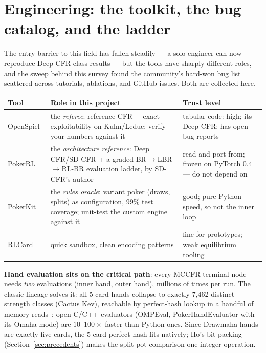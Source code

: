 \section{Engineering: the toolkit, the bug catalog, and the ladder}\label{sec:engineering}

The entry barrier to this field has fallen steadily --- a solo engineer can now reproduce Deep-CFR-class results --- but the tools have sharply different roles, and the sweep behind this survey found the community's hard-won bug list scattered across tutorials, ablations, and GitHub issues. Both are collected here.

\begin{center}
\footnotesize
\begin{tabular}{@{}lp{2.45in}p{1.5in}@{}}
\toprule
Tool & Role in this project & Trust level \\
\midrule
OpenSpiel~\cite{openspiel} & the \emph{referee}: reference CFR + exact exploitability on Kuhn/Leduc; verify your numbers against it & tabular code: high; its Deep CFR: has open bug reports \\
PokerRL~\cite{pokerrl} & the \emph{architecture reference}: Deep CFR/SD-CFR + a graded BR$\to$LBR$\to$RL-BR evaluation ladder, by SD-CFR's author & read and port from; frozen on PyTorch 0.4 --- do not depend on \\
PokerKit~\cite{pokerkit} & the \emph{rules oracle}: variant poker (draws, splits) as configuration, 99\% test coverage; unit-test the custom engine against it & good; pure-Python speed, so not the inner loop \\
RLCard~\cite{rlcard} & quick sandbox, clean encoding patterns & fine for prototypes; weak equilibrium tooling \\
\bottomrule
\end{tabular}
\end{center}

\textbf{Hand evaluation sits on the critical path}: every MCCFR terminal node needs \emph{two} evaluations (inner hand, outer hand), millions of times per run. The classic lineage solves it: all 5-card hands collapse to exactly 7{,}462 distinct strength classes (Cactus Kev), reachable by perfect-hash lookup in a handful of memory reads~\cite{cactuskev}; open C/C++ evaluators (OMPEval, PokerHandEvaluator with its Omaha mode) are $10$--$100\times$ faster than Python ones. Since Drawmaha hands are exactly five cards, the 5-card perfect hash fits natively; Ho's bit-packing (Section~\ref{sec:precedents}) makes the split-pot comparison one integer operation.

